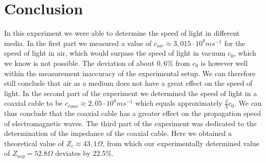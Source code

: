 \documentclass{scrartcl}
\begin{document}
\section{Conclusion}

In this experiment we were able to determine the speed of light in different media. In the first part we measured a value of $c_{air}\approx3,015\cdot10^8m s^{-1}$ for the speed of light in air, which would surpass the speed of light in vacuum $c_0$, which we know is not possible. The deviation of about $0,6\%$ from $c_0$ is however well within the measurement inaccuracy of the experimental setup. We can therefore still conclude that air as a medium does not have a great effect on the speed of light. In the second part of the experiment we determined the speed of light in a coaxial cable to be $c_{coax}\approx2,05\cdot10^8ms^{-1}$ which equals approximately $\frac{2}{3}c_0$. We can thus conclude that the coaxial cable has a greater effect on the propagation speed of electromagnetic waves.
The third part of the experiment was dedicated to the determination of the impedance of the coaxial cable. Here we obtained a theoretical value of $Z_c\approx43,1 \Omega$, from which our experimentally determined value of $Z_{avg}=52.8 \Omega $ deviates by 22.5\%.
\end{document}
